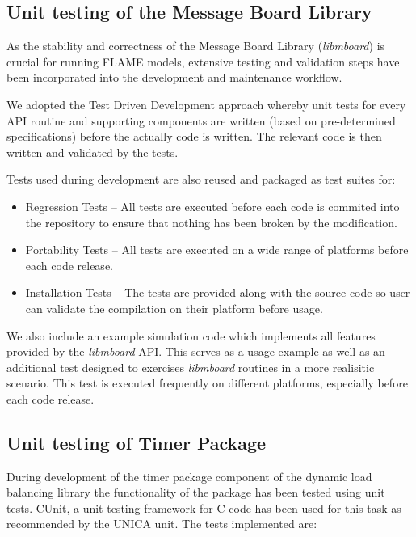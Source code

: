 \subsection{Unit testing of the Message Board Library}

As the stability and correctness of the Message Board Library (\textit{libmboard}) is crucial for running FLAME models, extensive testing and validation steps have been incorporated into the development and maintenance workflow. 

We adopted the Test Driven Development approach whereby unit tests for every API routine and supporting components are written (based on pre-determined specifications) before the actually code is written. The relevant code is then written and validated by the tests. 

Tests used during development are also reused and packaged as test suites for:
\begin{itemize}
\item Regression Tests -- All tests are executed before each code is commited into the repository to ensure that nothing has been broken by the modification.
\item Portability Tests -- All tests are executed on a wide range of platforms before each code release.
\item Installation Tests -- The tests are provided along with the source code so user can validate the compilation on their platform before usage.
\end{itemize}

We also include an example simulation code which implements all features provided by the \textit{libmboard} API. This serves as a usage example as well as an additional test designed to exercises \textit{libmboard} routines in a more realisitic scenario. This test is executed frequently on different platforms, especially before each code release.

\subsection{Unit testing of Timer Package}

During development of the timer package component of the dynamic load balancing library the functionality of the package has been tested using unit tests. CUnit, a unit testing framework for C code has been used for this task as recommended by the UNICA unit. The tests implemented are:

